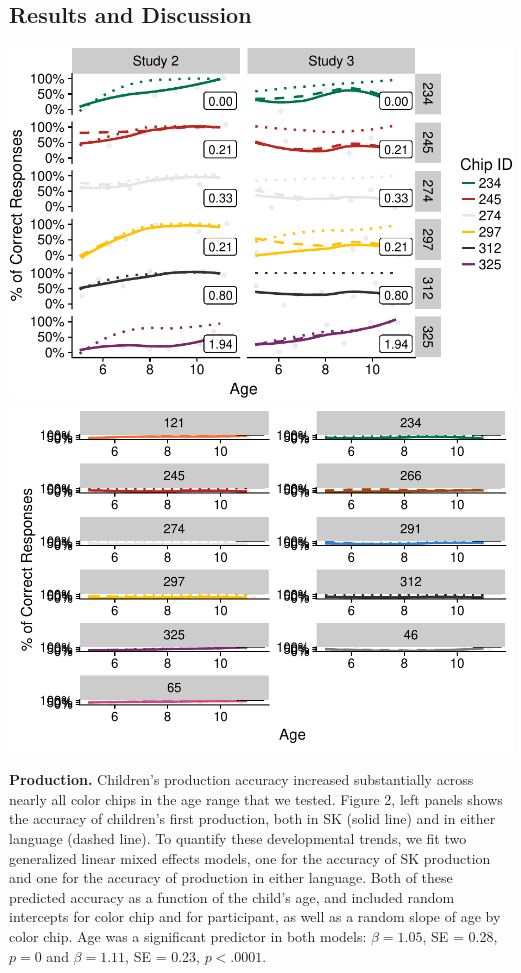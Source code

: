 \documentclass[floatsintext,man]{apa6}
\theoremstyle{definition}
\theoremstyle{definition}
\theoremstyle{definition}
\theoremstyle{remark}
\begin{document}
\subsection{Results and Discussion}\label{results-and-discussion-1}

\includegraphics{amazon_color_files/figure-latex/childfigure-1.pdf}
\includegraphics{amazon_color_files/figure-latex/childfigure-2.pdf}

\textbf{Production.} Children's production accuracy increased
substantially across nearly all color chips in the age range that we
tested. Figure 2, left panels shows the accuracy of children's first
production, both in SK (solid line) and in either language (dashed
line). To quantify these developmental trends, we fit two generalized
linear mixed effects models, one for the accuracy of SK production and
one for the accuracy of production in either language. Both of these
predicted accuracy as a function of the child's age, and included random
intercepts for color chip and for participant, as well as a random slope
of age by color chip. Age was a significant predictor in both models:
\(\beta = 1.05\), SE = 0.28, \(p = 0\) and \(\beta = 1.11\), SE = 0.23,
\(p < .0001\).
\end{document}
